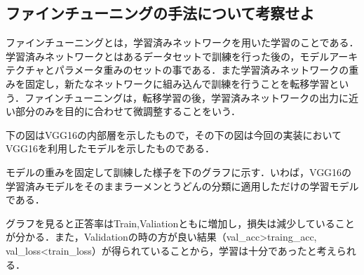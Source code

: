 \documentclass[uplatex,titlepage]{jsarticle}
\newif\iffigure
\begin{document}
\subsection{ファインチューニングの手法について考察せよ}
ファインチューニングとは，学習済みネットワークを用いた学習のことである．学習済みネットワークとはあるデータセットで訓練を行った後の，モデルアーキテクチャとパラメータ重みのセットの事である．また学習済みネットワークの重みを固定し，新たなネットワークに組み込んで訓練を行うことを転移学習という．ファインチューニングは，転移学習の後，学習済みネットワークの出力に近い部分のみを目的に合わせて微調整することをいう．\par
下の図はVGG16の内部層を示したもので，その下の図は今回の実装においてVGG16を利用したモデルを示したものである．
\iffigure
\begin{figure}[H]%
    \begin{center}
    \texttt{[image: vgg16\_model.png]} 
    \caption{VGG16モデル}
    \end{center}
\end{figure}
\fi
\iffigure
\begin{figure}[H]%
    \begin{center}
    \texttt{[image: finetyu\_before.png]} 
    \caption{ファインチューニングに用いたモデル}
    \end{center}
\end{figure}
\fi
モデルの重みを固定して訓練した様子を下のグラフに示す．いわば，VGG16の学習済みモデルをそのままラーメンとうどんの分類に適用しただけの学習モデルである．\par
グラフを見ると正答率はTrain,Valiationともに増加し，損失は減少していることが分かる．また，Validationの時の方が良い結果（val\_acc>traing\_acc, val\_loss<train\_loss）が得られていることから，学習は十分であったと考えられる．
\iffigure
\begin{figure}[H]
\begin{minipage}{8cm}%
  \begin{center}
   \texttt{[image: finetyu\_acc.png]} \\
   \caption{重みを凍結して学習したときの正答率の推移}
  \end{center}
\end{minipage}
\hfill
\begin{minipage}{8cm}%
  \begin{center}
    \texttt{[image: finetyu\_loss.png]} \\
    \caption{重みを凍結して学習したときの損失の推移}
  \end{center}
\end{minipage}
\end{figure}
\fi
\end{document}
